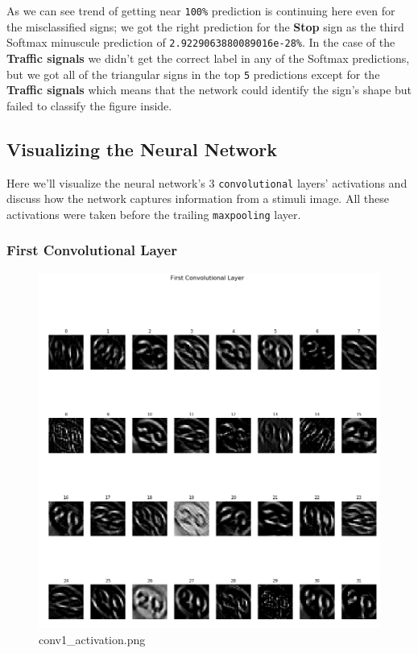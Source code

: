 \documentclass[11pt]{article}
\makeatletter
\def\maxwidth{\ifdim\Gin@nat@width>\linewidth\linewidth
    \else\Gin@nat@width\fi}
\let\Oldincludegraphics\includegraphics
\renewcommand{\includegraphics}[1]{\Oldincludegraphics[width=.8\maxwidth]{#1}}
\makeatother
\begin{document}
    As we can see trend of getting near \texttt{100\%} prediction is
continuing here even for the misclassified signs; we got the right
prediction for the \textbf{Stop} sign as the third Softmax minuscule
prediction of \texttt{2.9229063880089016e-28\%}. In the case of the
\textbf{Traffic signals} we didn't get the correct label in any of the
Softmax predictions, but we got all of the triangular signs in the top
\texttt{5} predictions except for the \textbf{Traffic signals} which
means that the network could identify the sign's shape but failed to
classify the figure inside.

    \hypertarget{visualizing-the-neural-network}{%
\subsection{Visualizing the Neural
Network}\label{visualizing-the-neural-network}}

Here we'll visualize the neural network's 3 \texttt{convolutional}
layers' activations and discuss how the network captures information
from a stimuli image. All these activations were taken before the
trailing \texttt{maxpooling} layer.

\hypertarget{first-convolutional-layer}{%
\subsubsection{First Convolutional
Layer}\label{first-convolutional-layer}}

\begin{figure}
\centering
\includegraphics{./assets/conv1.png}
\caption{conv1\_activation.png}
\end{figure}
\end{document}
